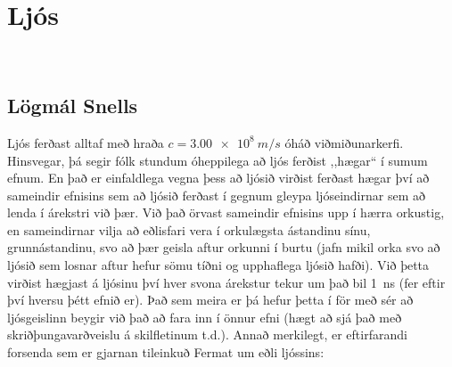 \chapter{Ljós}

\begin{tcolorbox}

 \\

\vspace{-0.5cm}
\end{tcolorbox}


\section{Lögmál Snells}

Ljós ferðast alltaf með hraða $c = \SI{3.00e8}{m/s}$ óháð viðmiðunarkerfi. Hinsvegar, þá segir fólk stundum óheppilega að ljós ferðist ,,hægar`` í sumum efnum. En það er einfaldlega vegna þess að ljósið virðist ferðast hægar því að sameindir efnisins sem að ljósið ferðast í gegnum gleypa ljóseindirnar sem að lenda í árekstri við þær. Við það örvast sameindir efnisins upp í hærra orkustig, en sameindirnar vilja að eðlisfari vera í orkulægsta ástandinu sínu, grunnástandinu, svo að þær geisla aftur orkunni í burtu (jafn mikil orka svo að ljósið sem losnar aftur hefur sömu tíðni og upphaflega ljósið hafði). Við þetta virðist hægjast á ljósinu því hver svona árekstur tekur um það bil \SI{1}{ns} (fer eftir því hversu þétt efnið er). Það sem meira er þá hefur þetta í för með sér að ljósgeislinn beygir við það að fara inn í önnur efni (hægt að sjá það með skriðþungavarðveislu á skilfletinum t.d.). Annað merkilegt, er eftirfarandi forsenda sem er gjarnan tileinkuð Fermat um eðli ljóssins:

